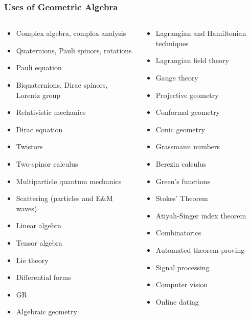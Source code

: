 \documentclass[12pt,xcolor={dvipsnames}]{beamer}
\begin{document}
\begin{frame}
  \frametitle{Uses of Geometric Algebra}
  \begingroup
  \fontsize{0.6em}{0.75em}\selectfont
  \begin{columns}
    \begin{column}{0.5\linewidth}
      \begin{itemize}
       \item Complex algebra, complex analysis
       \item Quaternions, Pauli spinors, rotations
       \item Pauli equation
       \item Biquaternions, Dirac spinors, Lorentz group
       \item Relativistic mechanics
       \item Dirac equation
       \item Twistors
       \item Two-spinor calculus
       \item Multiparticle quantum mechanics
       \item Scattering (particles and E\&M waves)
       \item Linear algebra
       \item Tensor algebra
       \item Lie theory
       \item Differential forms
       \item GR
       \item Algebraic geometry
      \end{itemize}
    \end{column}
    \begin{column}{0.5\linewidth}
      \begin{itemize}
       \item Lagrangian and Hamiltonian techniques
       \item Lagrangian field theory
       \item Gauge theory
       \item Projective geometry
       \item Conformal geometry
       \item Conic geometry
       \item Grassmann numbers
       \item Berezin calculus
       \item Green's functions
       \item Stokes' Theorem
       \item Atiyah-Singer index theorem
       \item Combinatorics
       \item Automated theorem proving
       \item Signal processing
       \item Computer vision
       \item Online dating
      \end{itemize}
    \end{column}
  \end{columns}
  \endgroup
\end{frame}
\end{document}
